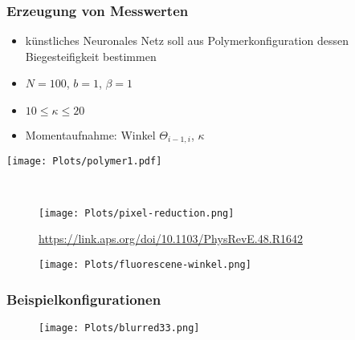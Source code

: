 \begin{frame}
  \frametitle{Erzeugung von Messwerten}
  \begin{minipage}{0.4\textwidth}
  \begin{itemize}
    \item künstliches Neuronales Netz soll aus Polymerkonfiguration
          dessen Biegesteifigkeit bestimmen
    \item $N=100$, $b=1$, $\beta = 1$
    \item $10 \leq \kappa \leq 20$
    \item Momentaufnahme: Winkel $\Theta_{i-1,i}$, $\kappa$
  \end{itemize}
  \end{minipage}%
  \hfill%
  \begin{minipage}{0.4\textwidth}
  \texttt{[image: Plots/polymer1.pdf]}
  \end{minipage}\\
  \begin{minipage}{0.4\textwidth}
    \begin{figure}
     \texttt{[image: Plots/pixel-reduction.png]}
     \caption{\url{https://link.aps.org/doi/10.1103/PhysRevE.48.R1642}}
    \end{figure}
  \end{minipage}%
  \hfill%
  \begin{minipage}{0.4\textwidth}
    \begin{figure}
    \texttt{[image: Plots/fluorescene-winkel.png]}
    \end{figure}
  \end{minipage}
\end{frame}

\begin{frame}
  \frametitle{Beispielkonfigurationen}
  \begin{figure}
    \centering
    \texttt{[image: Plots/blurred33.png]}
    \label{fig:bsp}
  \end{figure}
\end{frame}
